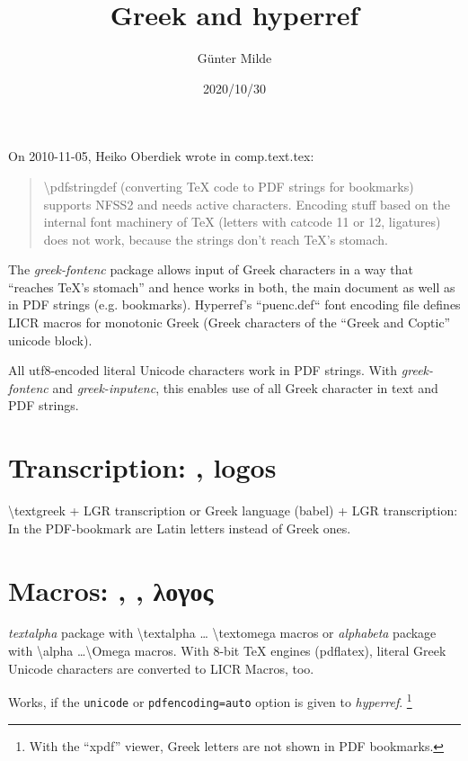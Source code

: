 \documentclass{article}
\begin{document}
\title{Greek and hyperref}
\author{Günter Milde}
\date{2020/10/30}
\maketitle

\noindent
On 2010-11-05, Heiko Oberdiek wrote in comp.text.tex:
%
\begin{quote}
   \textbackslash pdfstringdef (converting TeX code to PDF strings for
   bookmarks) supports NFSS2 and needs active characters. Encoding
   stuff based on the internal font machinery of TeX (letters with
   catcode 11 or 12, ligatures) does not work, because the strings
   don't reach TeX's stomach.
\end{quote}
%
The \emph{greek-fontenc} package allows input of Greek characters in a way
that ``reaches TeX's stomach'' and hence works in both, the main document as
well as in PDF strings (e.g. bookmarks). Hyperref's ``puenc.def`` font
encoding file defines LICR macros for monotonic Greek (Greek characters of
the ``Greek and Coptic'' unicode block).

All utf8-encoded literal Unicode characters work in PDF strings. With
\emph{greek-fontenc} and \emph{greek-inputenc}, this enables use of all
Greek character in text and PDF strings.

\section{Transcription: , \foreignlanguage{greek}{logos}}

\textbackslash{}textgreek + LGR transcription or
Greek language (babel) + LGR transcription:
In the PDF-bookmark are Latin letters instead of Greek ones.


\section{Macros:
	    \textlambda\textomicron\textgamma\textomicron\textvarsigma{},
            \lambda\omicron\gamma\omicron\varsigma{},
	    λογος}

\emph{textalpha} package with \textbackslash{}textalpha \ldots
\textbackslash{}textomega macros or \emph{alphabeta} package with
\textbackslash{}alpha \ldots \textbackslash{}Omega macros. With 8-bit TeX
engines (pdflatex), literal Greek Unicode characters are converted to LICR
Macros, too.

Works, if the \texttt{unicode} or \texttt{pdfencoding=auto} option is given
to \emph{hyperref}.%
\footnote{With the ``xpdf'' viewer, Greek letters are not shown
	  in PDF bookmarks.}
\end{document}
